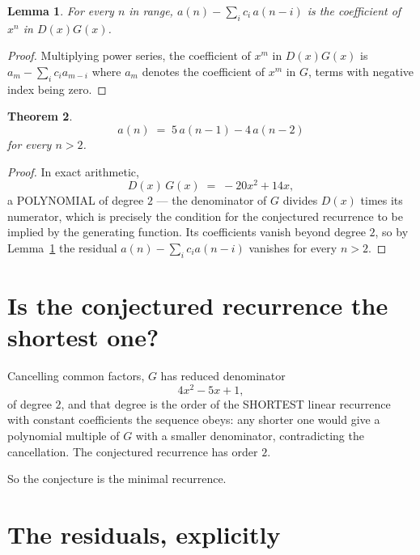 \documentclass[11pt,a4paper]{article}
\theoremstyle{plain}
\newtheorem{theorem}{Theorem}
\newtheorem{lemma}[theorem]{Lemma}
\theoremstyle{definition}
\begin{document}
\begin{lemma}\label{lem:key}
For every $n$ in range, $a(n)-\sum_i c_i\,a(n-i)$ is the coefficient of $x^{n}$ in
$D(x)G(x)$.
\end{lemma}

\begin{proof}
Multiplying power series, the coefficient of $x^{m}$ in $D(x)G(x)$ is
$a_m-\sum_i c_i a_{m-i}$ where $a_m$ denotes the coefficient of $x^{m}$ in $G$, terms with
negative index being zero.
\end{proof}

\begin{theorem}
\[
a(n)\;=\;5\,a(n-1) - 4\,a(n-2)
\]
for every $n>2$.
\end{theorem}

\begin{proof}
In exact arithmetic,
\[
D(x)\,G(x)\;=\;- 20 x^{2} + 14 x,
\]
a POLYNOMIAL of degree $2$ --- the denominator of $G$ divides $D(x)$ times its numerator,
which is precisely the condition for the conjectured recurrence to be implied by the
generating function. Its coefficients vanish beyond degree $2$, so by
Lemma~\ref{lem:key} the residual $a(n)-\sum_ic_ia(n-i)$ vanishes for every
$n>2$.
\end{proof}

\section{Is the conjectured recurrence the shortest one?}

Cancelling common factors, $G$ has reduced denominator
\[
4 x^{2} - 5 x + 1,
\]
of degree $2$, and that degree is the order of the SHORTEST linear recurrence with
constant coefficients the sequence obeys: any shorter one would give a polynomial multiple of
$G$ with a smaller denominator, contradicting the cancellation. The conjectured recurrence has
order $2$.

So the conjecture is the minimal recurrence.

\section{The residuals, explicitly}
\end{document}
